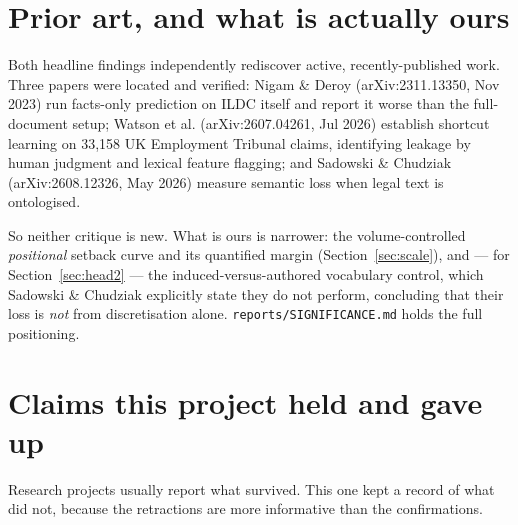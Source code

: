 \documentclass[12pt,a4paper]{article}
\newcommand{\code}[1]{\texttt{\small #1}}
\begin{document}
\section{Prior art, and what is actually ours}\label{sec:prior}

Both headline findings independently rediscover active, recently-published work. Three papers were
located and verified: Nigam \& Deroy (arXiv:2311.13350, Nov 2023) run facts-only prediction on ILDC
itself and report it worse than the full-document setup; Watson et al. (arXiv:2607.04261, Jul 2026)
establish shortcut learning on 33,158 UK Employment Tribunal claims, identifying leakage by human
judgment and lexical feature flagging; and Sadowski \& Chudziak (arXiv:2608.12326, May 2026) measure
semantic loss when legal text is ontologised.

So neither critique is new. What is ours is narrower: the volume-controlled \emph{positional}
setback curve and its quantified margin (Section~\ref{sec:scale}), and --- for
Section~\ref{sec:head2} --- the induced-versus-authored vocabulary control, which Sadowski \&
Chudziak explicitly state they do not perform, concluding that their loss is \emph{not} from
discretisation alone. \code{reports/SIGNIFICANCE.md} holds the full positioning.

\section{Claims this project held and gave up}\label{sec:retracted}

Research projects usually report what survived. This one kept a record of what did not, because the
retractions are more informative than the confirmations.
\end{document}
